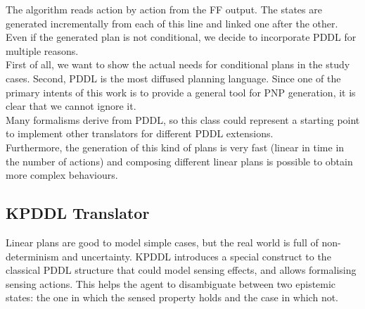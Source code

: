 \documentclass[pdftex,12pt,a4paper]{report}
\begin{document}
\noindent The algorithm reads action by action from the FF output. The states are generated incrementally from each of this line and linked one after the other. \\
\newline
\noindent Even if the generated plan is not conditional, we decide to incorporate PDDL for multiple reasons.\\ 
First of all, we want to show the actual needs for conditional plans in the study cases.
Second, PDDL is the most diffused planning language. Since one of the primary intents of this work is to provide a general tool for PNP generation, it is clear that we cannot ignore it.\\
Many formalisms derive from PDDL, so this class could represent a starting point to implement other translators for different PDDL extensions. \\
Furthermore, the generation of this kind of plans is very fast (linear in time in the number of actions) and composing different linear plans is possible to obtain more complex behaviours.

\newpage
\subsection{KPDDL Translator}
Linear plans are good to model simple cases, but the real world is full of non-determinism and uncertainty.
KPDDL introduces a special construct to the classical PDDL structure that could model sensing effects, and allows formalising sensing actions. This helps the agent to disambiguate between two epistemic states: the one in which the sensed property holds and the case in which not.\\
\newline

\end{document}
